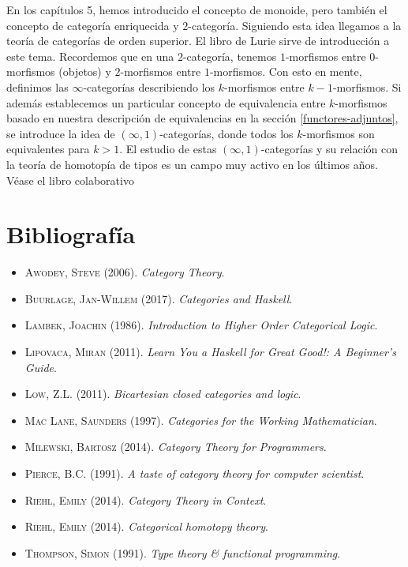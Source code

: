 \documentclass[12pt, twoside]{book}
\begin{document}
En los capítulos 5, hemos introducido el concepto de monoide, pero también el concepto de categoría enriquecida y $2$-categoría.
Siguiendo esta idea llegamos a la teoría de categorías de orden superior. El libro de Lurie sirve de introducción a este tema.
Recordemos que en una $2$-categoría, tenemos $1$-morfismos entre $0$-morfismos (objetos) y $2$-morfismos entre $1$-morfismos.
Con esto en mente, definimos las $\infty$-categorías describiendo los $k$-morfismos entre $k-1$-morfismos.
Si además establecemos un particular concepto de equivalencia entre $k$-morfismos basado en nuestra descripción de equivalencias en la sección \ref{functores-adjuntos}, se introduce la idea de $(\infty,1)$-categorías, donde todos los $k$-morfismos son equivalentes para $k > 1$.
El estudio de estas $(\infty,1)$-categorías y su relación con la teoría de homotopía de tipos es un campo muy activo en los últimos años.
Véase el libro colaborativo 

\backmatter

\chapter*{Bibliografía}
%
%

\begin{itemize}
  \item \textsc{Awodey, Steve} (2006). \emph{Category Theory}.
  \item \textsc{Buurlage, Jan-Willem} (2017). \emph{Categories and Haskell}.
  \item \textsc{Lambek, Joachin} (1986). \emph{Introduction to Higher Order Categorical Logic}.
  \item \textsc{Lipovaca, Miran} (2011). \emph{Learn You a Haskell for Great Good!: A Beginner's Guide}.
  \item \textsc{Low, Z.L.} (2011). \emph{Bicartesian closed categories and logic}.
  \item \textsc{Mac Lane, Saunders} (1997). \emph{Categories for the Working Mathematician}.
  \item \textsc{Milewski, Bartosz} (2014). \emph{Category Theory for Programmers}.
  \item \textsc{Pierce, B.C.} (1991). \emph{A taste of category theory for computer scientist}.
  \item \textsc{Riehl, Emily} (2014). \emph{Category Theory in Context}.
  \item \textsc{Riehl, Emily} (2014). \emph{Categorical homotopy theory}.
  \item \textsc{Thompson, Simon} (1991). \emph{Type theory \& functional programming}.
\end{itemize}

\printindex
\end{document}
